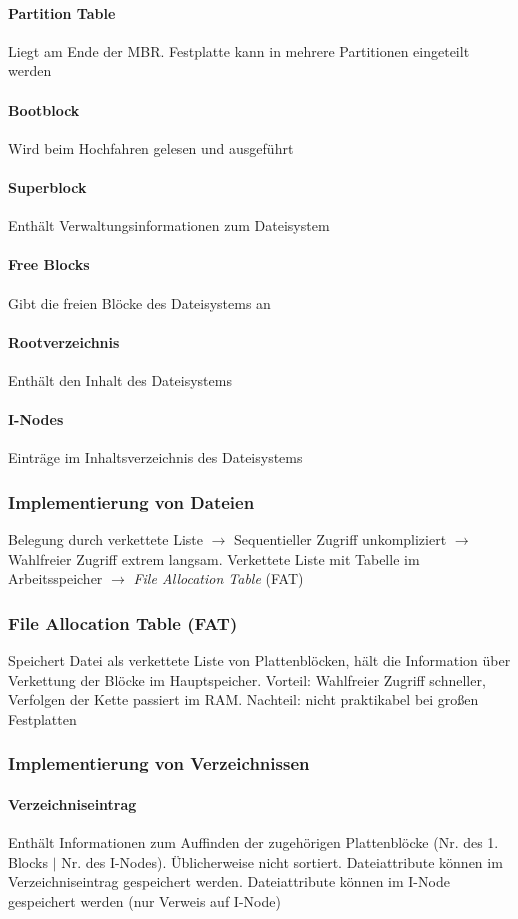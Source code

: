 \documentclass[11pt,a4paper,landscape]{article}
\begin{document}
\begin{multicols*}{3}
	\paragraph{Partition Table} Liegt am Ende der MBR. Festplatte kann in mehrere Partitionen eingeteilt werden
	\paragraph{Bootblock} Wird beim Hochfahren gelesen und ausgeführt
	\paragraph{Superblock} Enthält Verwaltungsinformationen zum Dateisystem
	\paragraph{Free Blocks} Gibt die freien Blöcke des Dateisystems an
	\paragraph{Rootverzeichnis} Enthält den Inhalt des Dateisystems
	\paragraph{I-Nodes} Einträge im Inhaltsverzeichnis des Dateisystems
	\subsubsection{Implementierung von Dateien}
	Belegung durch verkettete Liste $\rightarrow$ Sequentieller Zugriff unkompliziert $\rightarrow$ Wahlfreier Zugriff extrem langsam. Verkettete Liste mit Tabelle im Arbeitsspeicher $\rightarrow$ \textit{File Allocation Table} (FAT)
	\subsubsection{File Allocation Table (FAT)}
	Speichert Datei als verkettete Liste von Plattenblöcken, hält die Information über Verkettung der Blöcke im Hauptspeicher. Vorteil: Wahlfreier Zugriff schneller, Verfolgen der Kette passiert im RAM. Nachteil: nicht praktikabel bei großen Festplatten
	\subsubsection{Implementierung von Verzeichnissen}
	\paragraph{Verzeichniseintrag} Enthält Informationen zum Auffinden der zugehörigen Plattenblöcke (Nr. des 1. Blocks $\vert$ Nr. des I-Nodes). Üblicherweise nicht sortiert. Dateiattribute können im Verzeichniseintrag gespeichert werden. Dateiattribute können im I-Node gespeichert werden (nur Verweis auf I-Node)

\end{multicols*}
\end{document}
